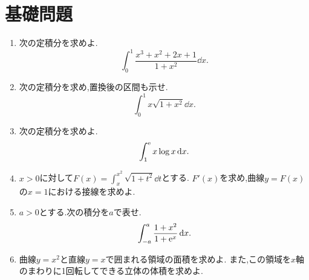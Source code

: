 \section{基礎問題}\label{節:総合基礎}

\begin{enumerate}[label=\textbf{\thechapter.\arabic*},leftmargin=*]
 \item\label{問:総合一割り算}
 次の定積分を求めよ.
 \[
  \int_0^1\frac{x^3+x^2+2x+1}{1+x^2}\dd x.
 \]
 \item\label{問:総合二置換}
 次の定積分を求め,置換後の区間も示せ.
 \[
  \int_0^1x\sqrt{1+x^2}\dd x.
 \]
 \item\label{問:総合三部分積分}
 次の定積分を求めよ.
 \[
  \int_1^{\mathrm{e}}x\log x\,\mathrm{d} x.
 \]
 \item\label{問:総合四動く端点}
 $x>0$に対して$F(x)=\int_x^{x^2}\sqrt{1+t^2}\dd t$とする.
 $F'(x)$を求め,曲線$y=F(x)$の$x=1$における接線を求めよ.
 \item\label{問:総合五相補重み}
 $a>0$とする.次の積分を$a$で表せ.
 \[
  \int_{-a}^{a}\frac{1+x^2}{1+\mathrm{e}^x}\,\mathrm{d} x.
 \]
 \item\label{問:総合六面積体積}
 曲線$y=x^2$と直線$y=x$で囲まれる領域の面積を求めよ.
 また,この領域を$x$軸のまわりに1回転してできる立体の体積を求めよ.
\end{enumerate}


